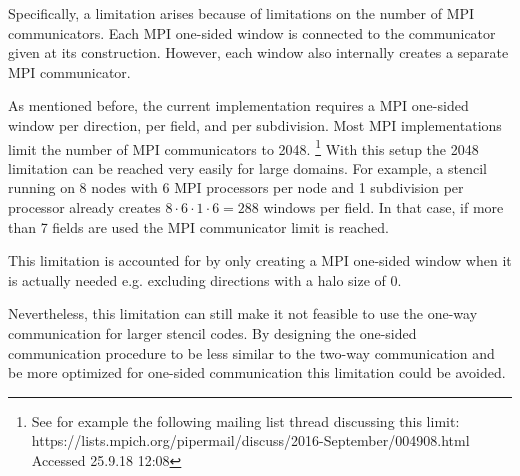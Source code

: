 Specifically, a limitation arises because of limitations on the number of MPI communicators.
Each MPI one-sided window is connected to the communicator given at its construction.
However, each window also internally creates a separate MPI communicator.

As mentioned before, the current implementation requires a MPI one-sided window per direction, per field, and per subdivision.
Most MPI implementations limit the number of MPI communicators to 2048. 
\footnote{See for example the following mailing list thread discussing this limit: https://lists.mpich.org/pipermail/discuss/2016-September/004908.html Accessed 25.9.18 12:08}
With this setup the 2048 limitation can be reached very easily for large domains.
For example, a stencil running on 8 nodes with 6 MPI processors per node and 1 subdivision per processor already creates $8 \cdot 6 \cdot 1 \cdot 6 = 288$ windows per field.
In that case, if more than 7 fields are used the MPI communicator limit is reached.

This limitation is accounted for by only creating a MPI one-sided window when it is actually needed e.g. excluding directions with a halo size of 0.

Nevertheless, this limitation can still make it not feasible to use the one-way communication for larger stencil codes.
By designing the one-sided communication procedure to be less similar to the two-way communication and be more optimized for one-sided communication this limitation could be avoided.

